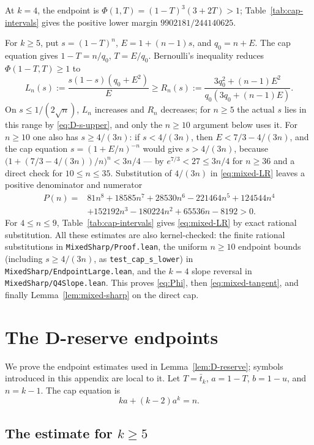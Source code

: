 \documentclass[11pt]{article}
\theoremstyle{definition}
\theoremstyle{remark}
\begin{document}
At $k=4$, the endpoint is
$\Phi(1,T)=(1-T)^3(3+2T)>1$; Table~\ref{tab:cap-intervals} gives the
positive lower margin $9902181/244140625$.

For $k\ge5$, put $s=(1-T)^n$, $E=1+(n-1)s$, and $q_0=n+E$.  The cap equation
gives $1-T=n/q_0$, $T=E/q_0$.  Bernoulli's inequality reduces
$\Phi(1-T,T)\ge1$ to
\begin{equation}\label{eq:mixed-LR}
 L_n(s):=\frac{s(1-s)(q_0+E^2)}E
 \ge
 R_n(s):=\frac{3q_0^2+(n-1)E^2}{q_0(3q_0+(n-1)E)}.
\end{equation}
On $s\le1/(2\sqrt n)$, $L_n$ increases and $R_n$ decreases; for
$n\ge5$ the actual $s$ lies in this range by \eqref{eq:D-s-upper}, and
only the $n\ge10$ argument below uses it.  For
$n\ge10$ one also has $s\ge4/(3n)$: if $s<4/(3n)$, then
$E<7/3-4/(3n)$, and the cap equation $s=(1+E/n)^{-n}$ would give
$s>4/(3n)$, because
$\bigl(1+(7/3-4/(3n))/n\bigr)^n<3n/4$ --- by
$e^{7/3}<27\le3n/4$ for $n\ge36$ and a direct check for
$10\le n\le35$.  Substitution of $4/(3n)$ in
\eqref{eq:mixed-LR} leaves a positive denominator and numerator
\begin{align*}
 P(n)={}&81n^8+18585n^7+28530n^6-221464n^5+124544n^4\\
 &+152192n^3-180224n^2+65536n-8192>0.
\end{align*}
For $4\le n\le9$, Table~\ref{tab:cap-intervals} gives
\eqref{eq:mixed-LR} by exact rational substitution.  All these estimates
are also kernel-checked: the finite rational substitutions in
\texttt{MixedSharp/Proof.lean}, the uniform $n\ge10$ endpoint bounds
(including $s\ge4/(3n)$, as \texttt{test\_cap\_s\_lower}) in
\texttt{MixedSharp/EndpointLarge.lean}, and the $k=4$ slope reversal in
\texttt{MixedSharp/Q4Slope.lean}.  This proves \eqref{eq:Phi}, then
\eqref{eq:mixed-tangent}, and finally Lemma~\ref{lem:mixed-sharp} on the
direct cap.

\section{The D-reserve endpoints}\label{app:D-reserve}

We prove the endpoint estimates used in Lemma~\ref{lem:D-reserve};
symbols introduced in this appendix are local to it.  Let
$T=\bar t_k$, $a=1-T$, $b=1-u$, and $n=k-1$.  The cap equation is
\begin{equation}\label{eq:D-cap-complement}
 ka+(k-2)a^k=n.
\end{equation}

\subsection{The estimate for \texorpdfstring{$k\ge5$}{k >= 5}}
\end{document}
